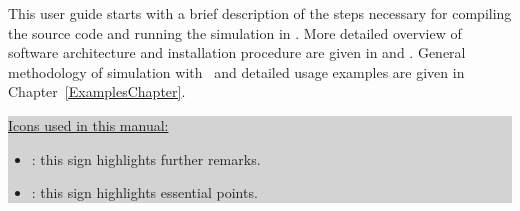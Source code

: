 This user guide starts with a brief description of the steps necessary for compiling 
the source code and running
the simulation in . More detailed overview of software architecture and
installation procedure are given in  and .
General methodology of simulation with \BornAgain\ and detailed usage examples are given
in Chapter~\ref{ExamplesChapter}.%
\vspace*{2mm}

\colorbox{Lightgray}{\parbox{0.95\linewidth}
{
\noindent \underline{Icons used in this manual:}
\begin{itemize}
\item[] \smallpencil: this sign highlights further remarks.
\item[] {\huge\danger}: this sign highlights essential points.
\end{itemize}
}
}


